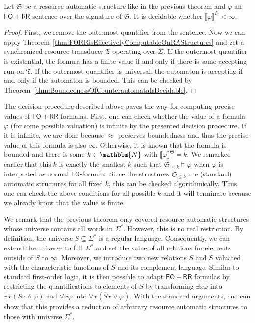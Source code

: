 \documentclass{LMCS}
\newcommand{\nat}{\mathbbm{N}}
\newcommand{\FO}{\ensuremath{\mathsf{FO}}}
\newcommand{\automatonT}{\mathfrak T}
\newcommand{\semantics}[1]{\llbracket#1\rrbracket}
\newcommand{\costEquiv}[1][\alpha]{\approx_{#1}}
\newcommand{\structureS}{\mathfrak S}
\newcommand{\FORR}{\ensuremath{\mathsf{FO\!\!+\!\!RR}}}
\begin{document}
\begin{cor}
	Let $\structureS$ be a resource automatic structure like in the previous 
	theorem and $\varphi$ an \FORR{} sentence over the signature of $\structureS$.
	It is decidable whether $\semantics{\varphi}^\structureS < \infty$. 
\end{cor}
\begin{proof}
First, we remove the outermost quantifier from the sentence. Now we can
apply Theorem~\ref{thm:FORRisEffectivelyComputableOnRAStructures} and get 
a synchronized resource transducer $\automatonT$ operating over $\Sigma$. 
If the outermost quantifier is existential, the formula has a finite value 
if and only if there is some accepting run on $\automatonT$. 
If the outermost quantifier is universal, the automaton is accepting if and 
only if the automaton is bounded. This can be checked by 
Theorem~\ref{thm:BoundednessOfCounterautomataIsDecidable}.
\end{proof}

The decision procedure described above paves the way for computing precise
values of \FORR{} formulas. First, one can check whether the value of a
formula $\varphi$ (for some possible valuation) is infinite by the presented
decision procedure. If it is infinite, we are done because $\costEquiv[]$
preserves boundedness and thus the precise value of this formula is also
$\infty$. Otherwise, it is known that the formula is bounded and there is some
$k \in \nat$ with $\semantics{\varphi}^\structureS = k$. We remarked earlier
that this $k$ is exactly the smallest $k$ such that $\structureS_{\le k} \models
\varphi$ when $\varphi$ is interpreted as normal \FO{}-formula. Since the
structures $\structureS_{\le k}$ are (standard) automatic structures for all
fixed $k$, this can be checked algorithmically. Thus, one can check the above
conditions for all possible $k$ and it will terminate because we already know
that the value is finite.


We remark that the previous theorem only covered resource automatic
structures whose universe contains all words in $\Sigma^*$. However, this is no real
restriction. By definition, the universe $S \subseteq \Sigma^*$ is a regular
language. Consequently, we can extend the universe to full $\Sigma^*$ and
set the value of all relations for elements outside of $S$ to $\infty$. 
Moreover, we introduce two new relations $S$ and $\overline{S}$ valuated
with the characteristic functions of $S$ and its complement language. 
Similar to standard first-order logic, it is then possible to adapt $\FORR$
formulas by restricting the quantifications to elements of $S$ by 
transforming $\exists x \varphi$ into $\exists x (Sx \wedge \varphi)$ 
and $\forall x \varphi$ into $\forall x (\overline{S}x \vee \varphi)$. 
With the standard arguments, one can show that this provides a reduction
of arbitrary resource automatic structures to those with universe $\Sigma^*$. 
\end{document}
